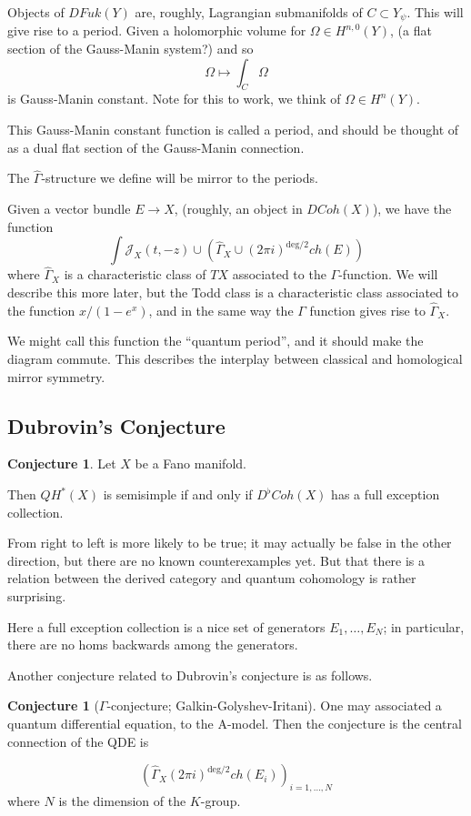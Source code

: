 \documentclass{amsart}
\theoremstyle{definition}
\newtheorem{conjecture}[dummy]{Conjecture}
\newcommand{\J}{\mathcal{J}}
\begin{document}
Objects of $DFuk(Y)$ are, roughly, Lagrangian submanifolds of $C\subset Y_\psi$.  This will give rise to a period.  Given a holomorphic volume for $\Omega\in H^{n,0}(Y)$, (a flat section of the Gauss-Manin system?) and so
$$\Omega\mapsto\int_C\Omega$$
is Gauss-Manin constant.  Note for this to work, we think of $\Omega\in H^n(Y)$.

This Gauss-Manin constant function is called a period, and should be thought of as a dual flat section of the Gauss-Manin connection.

The $\hat{\Gamma}$-structure we define will be mirror to the periods. 

Given a vector bundle $E\to X$, (roughly, an object in $DCoh(X)$), we have the function
$$\int \J_X(t,-z)\cup\left( \hat{\Gamma}_X\cup (2\pi i)^{\text{deg}/2} ch(E)\right)$$
where $\hat{\Gamma}_X$ is a characteristic class of $TX$ associated to the $\Gamma$-function.  We will describe this more later, but the Todd class is a characteristic class associated to the function $x/(1-e^x)$, and in the same way the $\Gamma$ function gives rise to $\hat{\Gamma}_X$.

We might call this function the ``quantum period'', and it should make the diagram commute.  This describes the interplay between classical and homological mirror symmetry.

\subsection{Dubrovin's Conjecture}

\begin{conjecture}
Let $X$ be a Fano manifold. 

Then $QH^*(X)$ is semisimple if and only if $D^\flat Coh(X)$ has a full exception collection.
\end{conjecture}

From right to left is more likely to be true; it may actually be false in the other direction, but there are no known counterexamples yet.  But that there is a relation between the derived category and quantum cohomology is rather surprising.

Here a full exception collection is a nice set of generators $E_1,\dots, E_N$; in particular, there are no homs backwards among the generators.

Another conjecture related to  Dubrovin's conjecture is as follows. 

\begin{conjecture}[$\Gamma$-conjecture; Galkin-Golyshev-Iritani]
 One may associated a quantum differential equation, to the A-model.  Then the conjecture is the central connection of the QDE is 

$$\left(\hat{\Gamma}_X (2\pi i)^{\text{deg}/2} ch(E_i)\right)_{i=1,\dots, N}$$
where $N$ is the dimension of the $K$-group.

\end{conjecture}
\end{document}
